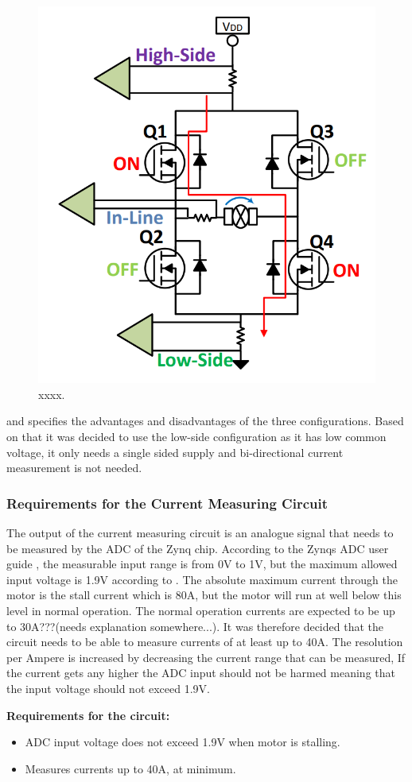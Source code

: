 \begin{figure}[h]
	\centering
    \includegraphics[width=0.5\linewidth]{graphics/shunt_sense_high_in_low}
	\caption{xxxx.}
	\label{fig:shunt_measure_high_in_low}
\end{figure}

\cite{shunt_placement} and \cite{Current_Sense_Circuit_Collection} specifies the advantages and disadvantages of the three configurations. 
Based on that it was decided to use the low-side configuration as it has low common voltage, it only needs a single sided supply and bi-directional current measurement is not needed.


\subsubsection{Requirements for the Current Measuring Circuit}
The output of the current measuring circuit is an analogue signal that needs to be measured by the ADC of the Zynq chip.
According to the Zynqs ADC user guide \cite{zynq_adc}, the measurable input range is from 0V to 1V, but the maximum allowed input voltage is 1.9V according to \cite{adc_zynq_webanswer}.
The absolute maximum current through the motor is the stall current which is 80A, but the motor will run at well below this level in normal operation.
The normal operation currents are expected to be up to 30A???(needs explanation somewhere...).
It was therefore decided that the circuit  needs to be able to measure currents of at least up to 40A.
The resolution per Ampere is increased by decreasing the current range that can be measured,
If the current gets any higher the ADC input should not be harmed meaning that the input voltage should not exceed 1.9V.

\textbf{Requirements for the circuit:}
\begin{itemize}
	\item ADC input voltage does not exceed 1.9V when motor is stalling.
	\item Measures currents up to 40A, at minimum.
\end{itemize}


